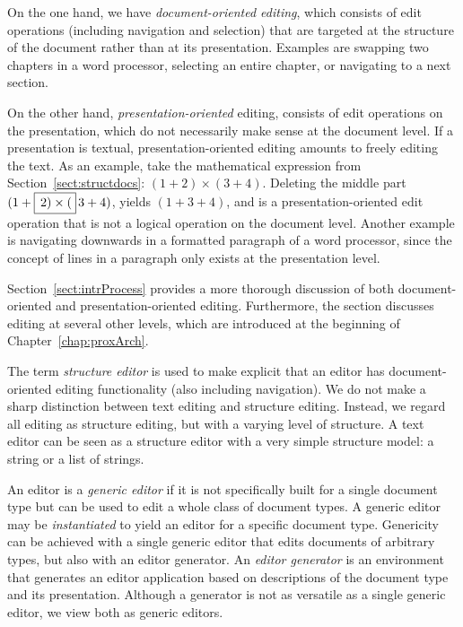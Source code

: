
On the one hand, we have {\em document-oriented editing}, which consists of edit operations (including navigation and selection) that are targeted at the structure of the document rather than at its presentation. Examples are swapping two chapters in a word processor, selecting an entire chapter, or navigating to a next section.

On the other hand, {\em presentation-oriented} editing, consists of edit operations on the presentation, which do not necessarily make sense at the document level. If a presentation is textual,  presentation-oriented editing amounts to freely editing the text. As an example, take the mathematical expression from Section~\ref{sect:structdocs}: $(1+2) \times (3+4)$. Deleting the middle part $(1+\framebox{$\,2) \times ($}\,3+4)$, yields $(1+3+4)$, and is a presentation-oriented edit operation that is not a logical operation on the document level. Another example is navigating downwards in a formatted paragraph of a word processor, since the concept of lines in a paragraph only exists at the presentation level. 

Section~\ref{sect:intrProcess} provides a more thorough discussion of both document-oriented and presentation-oriented editing. Furthermore, the section discusses editing at several other levels, which are introduced at the beginning of Chapter~\ref{chap:proxArch}.


The term {\em structure editor} is used to make explicit that an editor has document-oriented editing functionality (also including navigation). We do not make a sharp distinction between text editing and structure editing. Instead, we regard all editing as structure editing, but with a varying level of structure. A text editor can be seen as a structure editor with a very simple structure model: a string or a list of strings. 

An editor is a {\em generic editor} if it is not specifically built for a single document type but can be used to edit a whole class of document types. A generic editor may be {\em instantiated} to yield an editor for a specific document type. Genericity can be achieved with a single generic editor that edits documents of arbitrary types, but also with an editor generator. An {\em editor generator} is an environment that generates an editor application based on descriptions of the document type and its presentation. Although a generator is not as versatile as a single generic editor, we view both as generic editors. 


